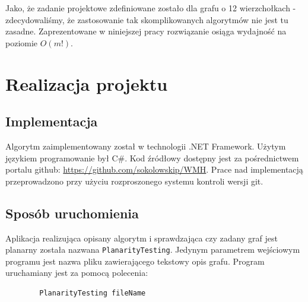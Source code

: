 \documentclass[a4 122pt]{article}
\begin{document}
		Jako, że zadanie projektowe zdefiniowane zostało dla grafu o 12 wierzchołkach - zdecydowaliśmy, że zastosowanie tak skomplikowanych algorytmów nie jest tu zasadne. 
		Zaprezentowane w niniejszej pracy rozwiązanie osiąga wydajność na poziomie $O(m!)$.

	\pagebreak
	
\section{Realizacja projektu}

		
	\subsection{Implementacja}

		Algorytm zaimplementowany został w technologii .NET Framework. Użytym językiem programowanie był C\#.
		Kod źródłowy dostępny jest za pośrednictwem portalu github: \url{https://github.com/sokolowskip/WMH}.
		Prace nad implementacją przeprowadzono przy użyciu rozproszonego systemu kontroli wersji git.

	\subsection{Sposób uruchomienia}
	
		Aplikacja realizująca opisany algorytm i sprawdzająca czy zadany graf jest planarny została nazwana \texttt{PlanarityTesting}. 
		Jedynym parametrem wejściowym programu jest nazwa pliku zawierającego tekstowy opis grafu. Program uruchamiany jest za pomocą polecenia:
		\begin{verbatim}
		PlanarityTesting fileName
		\end{verbatim}
\end{document}
